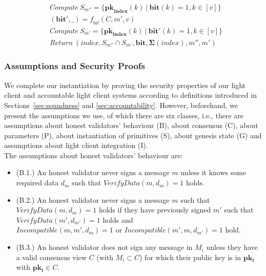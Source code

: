 \begin{itemize}
\begin{align*}
& \mathit{Compute} \ S_{m''} = \{ \mathbf{pk}_{\mathbf{index}}(k) \ | \ \mathbf{bit}(k) = 1, k \in [v] \} \\
& (\mathbf{bit'}, \_ ) = \mathit{f_{bit}}(C, m', v) \\ 
& \mathit{Compute} \ S_{m'} = \{ \mathbf{pk}_{\mathbf{index}}(k) \ | \ \mathbf{bit'}(k) = 1, k \in [v] \} \\
& \mathit{Return} \ (\mathit{index}, S_{m''} \cap S_{m'}, \mathbf{bit}, {\mathbf{\Sigma}}(\mathit{index}), {m''}, m' ) 
\end{align*}
\end{itemize}

\subsubsection{Assumptions and Security Proofs}
\label{sec:assumptions}
\label{sec:security_proofs}

\noindent We complete our instantiation by proving the security properties of our light client and accountable light client systems according to 
definitions introduced in Sections~\ref{sec:soundness} and \ref{sec:accountability}. However, beforehand, we present the assumptions we use, of 
which there are six classes, i.e., there are assumptions about honest validators' behaviour (B), about consensus (C), about parameters (P), about instantiation of primitives (S), 
about genesis state (G) and assumptions about light client integration (I). \\

\noindent The assumptions about honest validators' behaviour are:
\begin{itemize}
\item (B.1.) An honest validator never signs a message $m$ unless it knows some required data $d_m$  
such that $\mathit{VerifyData}(m, d_m) = 1$ holds.
\item (B.2.) An honest validator never signs a message $m$ such that $\mathit{VerifyData}(m, d_m) = 1$ holds 
if they have previously signed $m'$ such that $\mathit{VerifyData}(m', d_{m'}) = 1$ holds and \\ $\mathit{Incompatible}(m, m',d_m) = 1$ 
or $\mathit{Incompatible}(m', m, d_{m'}) =1$ hold.
\item (B.3.) An honest validator does not sign any message in $M_i$ unless they have a valid consensus view $C$ (with $M_i \subset C$) 
for which their public key is in $\mathbf{pk_i}$ with $\mathbf{pk_i} \in C$.
\end{itemize}

